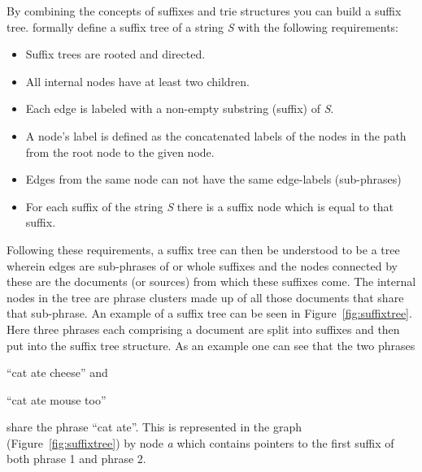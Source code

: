 By combining the concepts of suffixes and trie structures you can build a suffix tree. \cite{Oren1998} formally define a suffix tree of a string \textit{S} with the following requirements:
\begin{itemize}
\item Suffix trees are rooted and directed.
\item All internal nodes have at least two children.
\item Each edge is labeled with a non-empty substring (suffix) of \textit{S}.
\item A node's label is defined as the concatenated labels of the nodes in the path from the root node to the given node.
\item Edges from the same node can not have the same edge-labels (sub-phrases)
\item For each suffix of the string \textit{S} there is a suffix node which is equal to that suffix.
\end{itemize}


Following these requirements, a suffix tree can then be understood to be a tree wherein edges are sub-phrases of or whole suffixes and the nodes connected by these are the documents (or sources) from which these suffixes come. The internal nodes in the tree are phrase clusters made up of all those documents that share that sub-phrase. An example of a suffix tree can be seen in Figure~\ref{fig:suffixtree}. Here three phrases each comprising a document are split into suffixes and then put into the suffix tree structure. As an example one can see that the two phrases
\begin{inparaenum}[\itshape 1\upshape)]
\item ``cat ate cheese'' and
\item ``cat ate mouse too''
\end{inparaenum}
share the phrase ``cat ate''. This is represented in the graph (Figure~\ref{fig:suffixtree}) by node \textit{a} which contains pointers to the first suffix of both phrase 1 and phrase 2.

